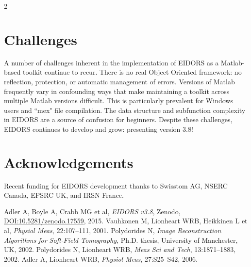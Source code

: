 \documentclass[10pt,a4paper]{article}
\renewenvironment{thebibliography}[1]{%
    \begin{oldthebibliography}{#1}%
      \setlength{\parskip}{0ex}%
      \setlength{\itemsep}{0ex}%
  }%
  {%
    \end{oldthebibliography}%
  }
\begin{document}
\begin{multicols}{2}
\section{Challenges}
A number of challenges inherent in the implementation of EIDORS as a Matlab-based toolkit continue to recur.
There is no real Object Oriented framework: no reflection, protection, or
  automatic management of errors.
Versions of Matlab frequently vary in confounding ways that make
  maintaining a toolkit across multiple Matlab versions difficult. This is
  particularly prevalent for Windows users and ``mex" file compilation.
The data structure and subfunction complexity in EIDORS are a
  source of confusion for beginners.
Despite these challenges, EIDORS continues to develop and grow: presenting version 3.8!

\section*{Acknowledgements}
Recent funding for EIDORS development thanks to
Swisstom AG, NSERC Canada, EPSRC UK, and IRSN France.

\footnotesize
\begin{thebibliography}{}
   Adler A, Boyle A, Crabb MG et al,
   {\em EIDORS v3.8}, Zenodo,
   \href{http://dx.doi.org/10.5281/zenodo.17559}{DOI:10.5281/zenodo.17559},
    2015.
   Vauhkonen M, Lionheart WRB, Heikkinen L et al,
   {\em  Physiol Meas}, 22:107--111, 2001.
   Polydorides N,
 {\em Image Reconstruction Algorithms for Soft-Field Tomography}, Ph.D. thesis,
   University of Manchester, UK, 2002.
   Polydorides N, Lionheart WRB,
   {\em Meas Sci and Tech}, 13:1871--1883, 2002.
   Adler A, Lionheart WRB, {\em Physiol Meas}, 27:S25--S42, 2006.
\end{thebibliography}
\end{multicols}
\end{document}
